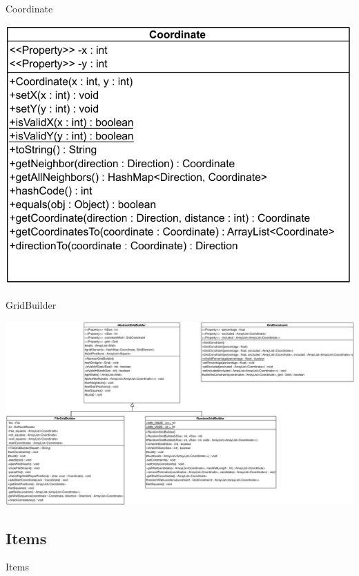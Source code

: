 \documentclass[11pt,t]{beamer}
\begin{document}
\begin{frame}{Coordinate}
\begin{center}
\includegraphics[scale=0.5]{images/coordinate}
\end{center}
\end{frame}


\begin{frame}{GridBuilder}
\begin{center}
\includegraphics[width=1\linewidth]{images/gridbuilder}
\end{center}
\end{frame}

\subsection{Items}

\begin{frame}{Items}
\end{frame}
\end{document}
